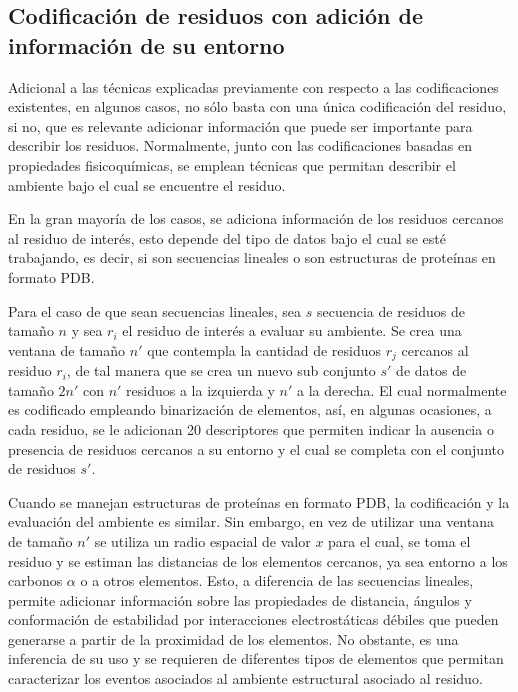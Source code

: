 \subsection{Codificación de residuos con adición de información de su entorno}

Adicional a las técnicas explicadas previamente con respecto a las codificaciones existentes, en algunos casos, no sólo basta con una única codificación del residuo, si no, que es relevante adicionar información que puede ser importante para describir los residuos. Normalmente, junto con las codificaciones basadas en propiedades fisicoquímicas, se emplean técnicas que permitan describir el ambiente bajo el cual se encuentre el residuo.

En la gran mayoría de los casos, se adiciona información de los residuos cercanos al residuo de interés, esto depende del tipo de datos bajo el cual se esté trabajando, es decir, si son secuencias lineales o son estructuras de proteínas en formato PDB. 

Para el caso de que sean secuencias lineales, sea $s$ secuencia de residuos de tamaño $n$ y sea $r_{i}$ el residuo de interés a evaluar su ambiente. Se crea una ventana de tamaño $n'$ que contempla la cantidad de residuos $r_j$ cercanos al residuo $r_{i}$, de tal manera que se crea un nuevo sub conjunto $s'$ de datos de tamaño $2n'$ con $n'$ residuos a la izquierda y $n'$ a la derecha. El cual normalmente es codificado empleando binarización de elementos, así, en algunas ocasiones, a cada residuo, se le adicionan 20 descriptores que permiten indicar la ausencia o presencia de residuos cercanos a su entorno y el cual se completa con el conjunto de residuos $s'$.

Cuando se manejan estructuras de proteínas en formato PDB, la codificación y la evaluación del ambiente es similar. Sin embargo, en vez de utilizar una ventana de tamaño $n'$ se utiliza un radio espacial de valor $x$ para el cual, se toma el residuo y se estiman las distancias de los elementos cercanos, ya sea entorno a los carbonos $\alpha$ o a otros elementos. Esto, a diferencia de las secuencias lineales, permite adicionar información sobre las propiedades de distancia, ángulos y conformación de estabilidad por interacciones electrostáticas débiles que pueden generarse a partir de la proximidad de los elementos. No obstante, es una inferencia de su uso y se requieren de diferentes tipos de elementos que permitan caracterizar los eventos asociados al ambiente estructural asociado al residuo.


